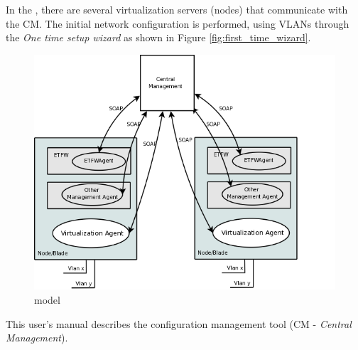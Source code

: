 In the \acronym, there are several virtualization servers (nodes) that communicate with the CM. The initial network configuration is performed, using VLANs through the \emph{One time setup wizard} as shown in Figure \ref{fig:first_time_wizard}.

\begin{figure}[H]
    \begin{center}
	\includegraphics[scale=0.6]{screenshots/etva_enterprise.png}
	\caption{\acronym model}
	\label{fig:etva_enterprise}
	\end{center}
\end{figure}

This user's manual describes the configuration management tool (CM - \emph{Central Management}). 

\pagebreak
%
